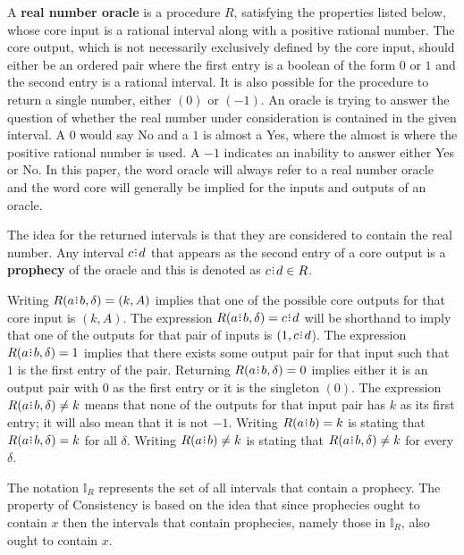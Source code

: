 \documentclass[12pt]{article}
\begin{document}
A \textbf{real number oracle} is a procedure $R$, satisfying the properties listed below, whose core input is a rational interval along with a positive rational number. The core output, which is not necessarily exclusively defined by the core input, should either be an ordered pair where the first entry is a boolean of the form  $0$ or $1$ and the second entry is a rational interval. It is also possible for the procedure to return a single number, either $(0)$ or $(-1)$. An oracle is trying to answer the question of whether the real number under consideration is contained in the given interval. A $0$ would say No and a $1$ is almost a Yes, where the almost is where the positive rational number is used. A $-1$ indicates an inability to answer either Yes or No. In this paper, the word oracle will always refer to a real number oracle and the word core will generally be implied for the inputs and outputs of an oracle.


The idea for the returned intervals is that they are considered to contain the real number. Any interval $c\rint d$ that appears as the second entry of a core output is a \textbf{prophecy} of the oracle and this is denoted as $c\rint d \in R$. 

Writing $R(a\rint b, \delta)=(k ,A)$ implies that one of the possible core outputs for that core input is $(k, A)$. The expression $R(a\rint b, \delta) = c\rint d$ will be shorthand to imply that one of the outputs for that pair of inputs is $(1, c\rint d$).  The expression $R(a \rint b, \delta) = 1$ implies that there exists some output pair for that input such that $1$ is the first entry of the pair. Returning $R(a\rint b, \delta) = 0$ implies either it is an output pair with $0$ as the first entry or it is the singleton $(0)$. The expression $R(a\rint b, \delta) \neq k$ means that none of the outputs for that input pair has $k$ as its first entry; it will also mean that it is not $-1$.  Writing $R(a \rint b) = k$ is stating that $R(a \rint b, \delta) = k$ for all $\delta$.  Writing $R(a \rint b) \neq k$ is stating that  $R(a\rint b, \delta) \neq k$ for every $\delta$. 

The notation $\mathbb{I}_R$ represents the set of all intervals that contain a prophecy. The property of Consistency is based on the idea that since prophecies ought to contain $x$ then the intervals that contain prophecies, namely those in $\mathbb{I}_R$,  also ought to contain $x$. 
\end{document}
